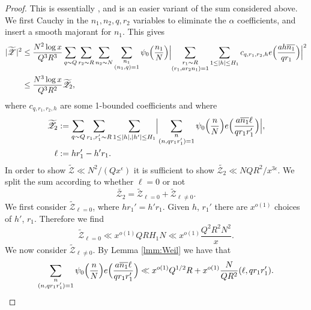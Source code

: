 \documentclass[10pt]{amsart}
\theoremstyle{plain}
\numberwithin{equation}{section}
\begin{document}
\begin{proof}
This is essentially \cite[\S 9]{Zhang}, and is an easier variant of the sum considered above. We first Cauchy in the $n_1,n_2,q,r_2$ variables to eliminate the $\alpha$ coefficients, and insert a smooth majorant for $n_1$. This gives
\begin{align*}
|\widetilde{\mathscr{Z}^{}}|^2&\le \frac{N^2\log{x}}{Q^3 R^3}\sum_{q\sim Q}\sum_{r_2\sim R}\sum_{n_2\sim N}\sum_{\substack{n_1 \\ (n_1,q)=1}}\psi_{0}\Bigl(\frac{n_1}{N}\Bigr)\Bigl|\sum_{\substack{r_1\sim R\\ (r_1,a r_2 n_1)=1}}\sum_{1\le|h|\le H_1}c_{q,r_1,r_2,h}e\Bigl(\frac{a h \overline{n_1}}{q r_1}\Bigr)\Bigr|^2\\
&\le \frac{N^3\log{x}}{Q^3 R^2}\widetilde{\mathscr{Z}_2},
\end{align*}
where $c_{q,r_1,r_2,h}$ are some 1-bounded coefficients and where
\begin{align*}
\widetilde{\mathscr{Z}_2}&:=\sum_{q\sim Q} \sum_{r_1,r_1'\sim R}\sum_{1\le |h|,|h'|\le H_1}\Bigl|\sum_{\substack{n\\ (n,q r_1 r_1')=1}}\psi_0\Bigl(\frac{n}{N}\Bigr)e\Bigl(\frac{a \overline{n_1}\ell}{q r_1r_1'}\Bigr)\Bigr|,\\
\ell&:=h r_1'-h' r_1.
\end{align*}
In order to show $\widetilde{\mathscr{Z}}\ll N^2/(Q x^\epsilon)$ it is sufficient to show $\widetilde{\mathscr{Z}_2}\ll N Q R^2/x^{3\epsilon}$. We split the sum according to whether $\ell=0$ or not
\begin{equation}
\widetilde{\mathscr{Z}_2}=\widetilde{\mathscr{Z}}_{\ell=0}+\widetilde{\mathscr{Z}}_{\ell\ne 0}.
\label{eq:Z2}
\end{equation}
We first consider $\widetilde{\mathscr{Z}}_{\ell=0}$, where $h r_1'=h' r_1$. Given $h$, $r_1'$ there are $x^{o(1)}$ choices of $h'$, $r_1$. Therefore we find
\begin{equation}
\widetilde{\mathscr{Z}}_{\ell=0}\ll x^{o(1)} Q R H_1 N\ll x^{o(1)}\frac{Q^2 R^2 N^2}{x}.
\label{eq:Z21}
\end{equation}
We now consider $\widetilde{\mathscr{Z}}_{\ell\ne 0}$. By Lemma \ref{lmm:Weil} we have that
\begin{equation}
\sum_{\substack{n\\ (n,q r_1 r_1')=1}}\psi_0\Bigl(\frac{n}{N}\Bigr)e\Bigl(\frac{a \overline{n_1}\ell}{q r_1r_1'}\Bigr)\ll x^{o(1)}Q^{1/2} R + x^{o(1)}\frac{N}{Q R^2}(\ell,qr_1r_1').\label{eq:Z2Weil}
\end{equation}

\end{proof}
\end{document}
